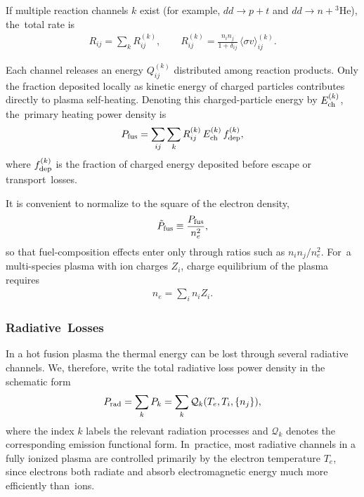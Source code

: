 \documentclass[particles,article,accept,pdftex,moreauthors]{Definitions/mdpi}
\begin{document}
If multiple reaction channels $k$ exist (for example, $dd\to p+t$ and $dd\to n+{}^3$He), the~total rate is
\begin{align}
R_{ij}
= \sum_k R_{ij}^{(k)}, 
\qquad
R_{ij}^{(k)}
= \frac{n_i n_j}{1+\delta_{ij}}
\,\langle \sigma v\rangle_{ij}^{(k)} .
\end{align}

Each channel releases an energy $Q_{ij}^{(k)}$ distributed among reaction products. Only the fraction deposited locally as kinetic energy of charged particles contributes directly to plasma self-heating. Denoting this charged-particle energy by $E_{\rm ch}^{(k)}$, the~primary heating power density is
\begin{align}
P_{\rm fus}
= \sum_{ij}\sum_k 
R_{ij}^{(k)}\,E_{\rm ch}^{(k)}\,f_{\rm dep}^{(k)},
\label{eq:powerFusion}
\end{align}
where $f_{\rm dep}^{(k)}$ is the fraction of charged energy deposited before escape or transport~losses. 

It is convenient to normalize to the square of the electron density,
\begin{align}
\tilde P_{\rm fus}
\equiv \frac{P_{\rm fus}}{n_e^2},
\end{align}
so that fuel-composition effects enter only through ratios such as $n_i n_j/n_e^2$. For~a multi-species plasma with ion charges $Z_i$, charge equilibrium of the plasma requires
\begin{align}
n_e = \sum_i n_i Z_i .
\end{align}

\subsubsection{Radiative~Losses}\label{sssec:RadLosses}

In a hot fusion plasma the thermal energy can be lost through several radiative channels. We, therefore, write the total radiative loss power density in the schematic form
\begin{align}
P_{\rm rad}
= \sum_k P_k
= \sum_k \mathcal{Q}_k(T_e,T_i,\{n_j\}),
\end{align}
where the index $k$ labels the relevant radiation processes and $\mathcal{Q}_k$ denotes the corresponding emission functional form. In~practice, most radiative channels in a fully ionized plasma are controlled primarily by the electron temperature $T_e$, since electrons both radiate and absorb electromagnetic energy much more efficiently than~ions.
\end{document}
